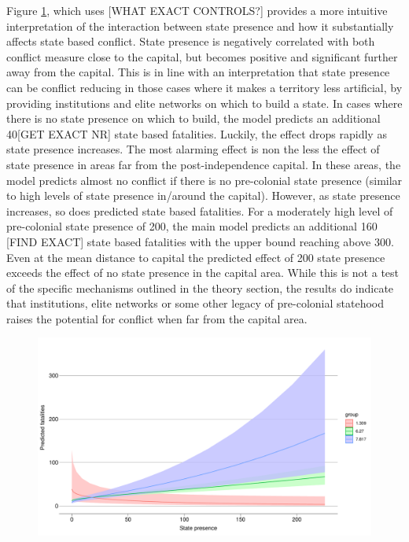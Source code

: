 \documentclass[12pt]{article}
\begin{document}
Figure \ref{deaths_int}, which uses [WHAT EXACT CONTROLS?] provides a more
intuitive interpretation of the interaction between state presence and how it
substantially affects state based conflict. State presence is negatively
correlated with both conflict measure close to the capital, but becomes positive
and significant further away from the capital. This is in line with an
interpretation that state presence can be conflict reducing in those cases where
it makes a territory less artificial, by providing institutions and elite
networks on which to build a state. In cases where there is no state presence on
which to build, the model predicts an additional 40[GET EXACT NR] state based
fatalities. Luckily, the effect drops rapidly as state presence increases. The
most alarming effect is non the less the effect of state presence in areas far
from the post-independence capital. In these areas, the model predicts almost no
conflict if there is no pre-colonial state presence (similar to high levels of
state presence in/around the capital). However, as state presence increases, so
does predicted state based fatalities. For a moderately high level of
pre-colonial state presence of 200, the main model predicts an additional 160
[FIND EXACT] state based fatalities with the upper bound reaching above 300.
Even at the mean distance to capital the predicted effect of 200 state presence
exceeds the effect of no state presence in the capital area. While this is not a
test of the specific mechanisms outlined in the theory section, the results do
indicate that institutions, elite networks or some other legacy of pre-colonial
statehood raises the potential for conflict when far from the capital area.



\begin{figure}[htpb]
	\centering
	\includegraphics[width=\linewidth]{"../R/Output/deathsIntPlot.pdf"}
	\caption{}
	\label{deaths_int}
\end{figure}
\end{document}
